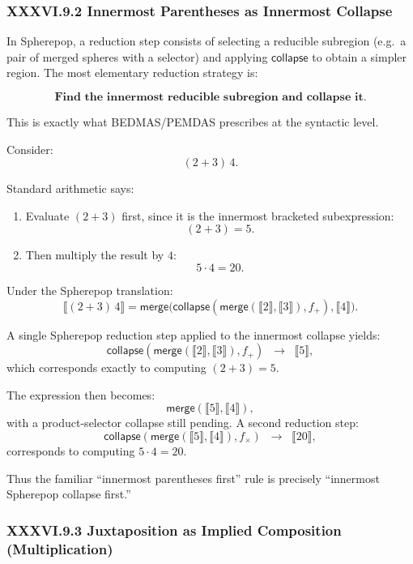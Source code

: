 \documentclass[12pt,letterpaper]{article}
\begin{document}
\subsubsection*{XXXVI.9.2 Innermost Parentheses as Innermost Collapse}

In Spherepop, a reduction step consists of selecting a reducible subregion 
(e.g.\ a pair of merged spheres with a selector) and applying $\mathsf{collapse}$ to
obtain a simpler region. The most elementary reduction strategy is:

\[
\textbf{Find the innermost reducible subregion and collapse it.}
\]

This is exactly what BEDMAS/PEMDAS prescribes at the syntactic level.

Consider:
\[
(2 + 3)\,4.
\]

Standard arithmetic says:

\begin{enumerate}
  \item Evaluate $(2+3)$ first, since it is the innermost bracketed subexpression:
    \[
    (2+3) = 5.
    \]
  \item Then multiply the result by $4$:
    \[
    5 \cdot 4 = 20.
    \]
\end{enumerate}

Under the Spherepop translation:
\[
\llbracket (2 + 3)\,4 \rrbracket
=
\mathsf{merge}\big(
  \mathsf{collapse}(\mathsf{merge}(\llbracket 2 \rrbracket,\llbracket 3 \rrbracket), f_+),
  \llbracket 4 \rrbracket
\big).
\]

A single Spherepop reduction step applied to the innermost collapse yields:
\[
\mathsf{collapse}(\mathsf{merge}(\llbracket 2 \rrbracket,\llbracket 3 \rrbracket), f_+)
\;\;\longrightarrow\;\;
\llbracket 5 \rrbracket,
\]
which corresponds exactly to computing $(2+3) = 5$.

The expression then becomes:
\[
\mathsf{merge}(\llbracket 5 \rrbracket, \llbracket 4 \rrbracket),
\]
with a product-selector collapse still pending. A second reduction step:
\[
\mathsf{collapse}(\mathsf{merge}(\llbracket 5 \rrbracket, \llbracket 4 \rrbracket), f_{\times})
\;\;\longrightarrow\;\;
\llbracket 20 \rrbracket,
\]
corresponds to computing $5 \cdot 4 = 20$.

Thus the familiar “innermost parentheses first” rule is precisely 
“innermost Spherepop collapse first.”

\subsubsection*{XXXVI.9.3 Juxtaposition as Implied Composition (Multiplication)}
\end{document}
